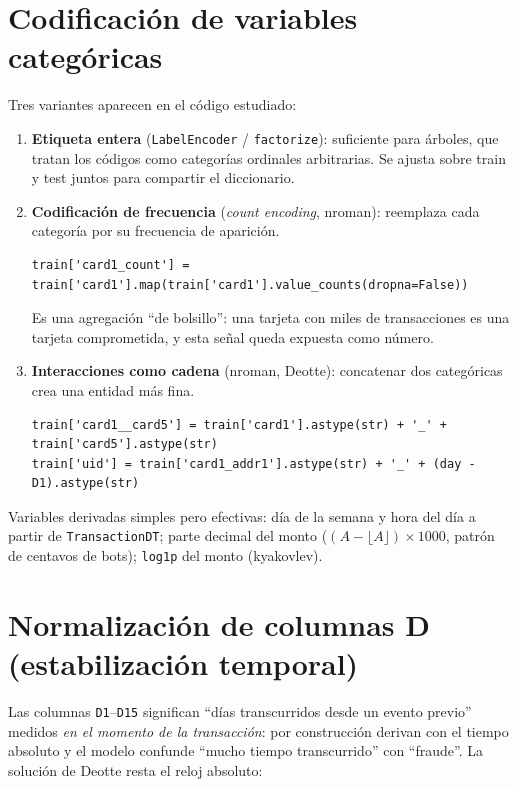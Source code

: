 \section{Codificación de variables categóricas}

Tres variantes aparecen en el código estudiado:

\begin{enumerate}
  \item \textbf{Etiqueta entera} (\texttt{LabelEncoder} / \texttt{factorize}): suficiente para
        árboles, que tratan los códigos como categorías ordinales arbitrarias. Se ajusta sobre
        train y test juntos para compartir el diccionario.
  \item \textbf{Codificación de frecuencia} (\emph{count encoding}, nroman): reemplaza cada
        categoría por su frecuencia de aparición.
        \begin{lstlisting}
train['card1_count'] = train['card1'].map(train['card1'].value_counts(dropna=False))
        \end{lstlisting}
        Es una agregación ``de bolsillo'': una tarjeta con miles de transacciones es una tarjeta
        comprometida, y esta señal queda expuesta como número.
  \item \textbf{Interacciones como cadena} (nroman, Deotte): concatenar dos categóricas crea una
        entidad más fina.
        \begin{lstlisting}
train['card1__card5'] = train['card1'].astype(str) + '_' + train['card5'].astype(str)
train['uid'] = train['card1_addr1'].astype(str) + '_' + (day - D1).astype(str)
        \end{lstlisting}
\end{enumerate}

Variables derivadas simples pero efectivas: día de la semana y hora del día a partir de
\texttt{TransactionDT}; parte decimal del monto ($(A - \lfloor A\rfloor)\times 1000$, patrón de
centavos de bots); \texttt{log1p} del monto (kyakovlev).

\section{Normalización de columnas D (estabilización temporal)}
\label{sec:dcols}

Las columnas \texttt{D1}--\texttt{D15} significan ``días transcurridos desde un evento previo''
medidos \emph{en el momento de la transacción}: por construcción derivan con el tiempo absoluto
y el modelo confunde ``mucho tiempo transcurrido'' con ``fraude''. La solución de Deotte
resta el reloj absoluto:


